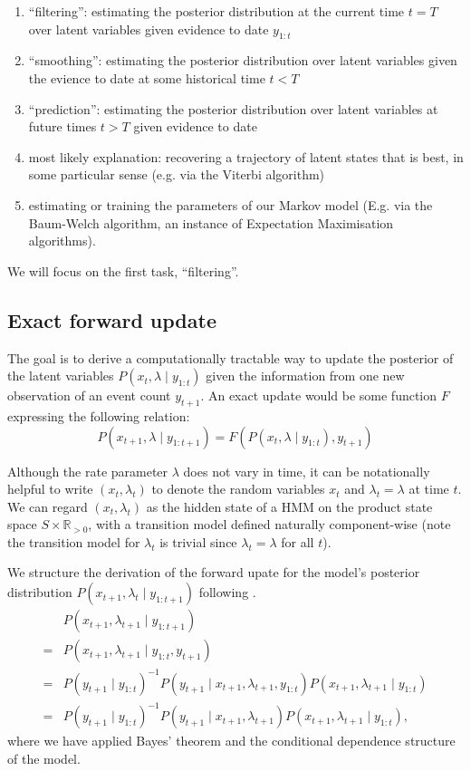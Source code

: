 \documentclass[twoside, 11pt]{article}
\newcommand{\reals}[0] {\mathbb{R}}
\begin{document}
\begin{enumerate}
\item ``filtering'': estimating the posterior distribution at the current time $t=T$ over latent variables given evidence to date $y_{1:t}$
\item ``smoothing'': estimating the posterior distribution over latent variables given the evience to date at some historical time $t<T$
\item ``prediction'': estimating the posterior distribution over latent variables at future times $t>T$ given evidence to date
\item most likely explanation: recovering a trajectory of latent states that is best, in some particular sense (e.g. via the Viterbi algorithm)
\item estimating or training the parameters of our Markov model (E.g. via the Baum-Welch algorithm, an instance of Expectation Maximisation algorithms).
\end{enumerate}

We will focus on the first task, ``filtering''.

\subsection{Exact forward update}

The goal is to derive a computationally tractable way to update the posterior of the latent variables $P(x_t, \lambda \mid y_{1:t})$ given the information from one new observation of an event count $y_{t+1}$. An exact update would be some function $F$ expressing the following relation:
\begin{equation}
P(x_{t+1}, \lambda \mid y_{1:t+1}) = F\left( P(x_t, \lambda \mid y_{1:t}), y_{t+1}\right)
\end{equation}

Although the rate parameter $\lambda$ does not vary in time, it can be notationally helpful to write $(x_t, \lambda_t)$ to denote the random variables $x_t$ and $\lambda_t=\lambda$ at time $t$. We can regard $(x_t, \lambda_t)$ as the hidden state of a HMM on the product state space $S \times \reals_{>0}$, with a transition model defined naturally component-wise (note the transition model for $\lambda_t$ is trivial since $\lambda_t=\lambda$ for all $t$).

We structure the derivation of the forward upate for the model's posterior distribution $P(x_{t+1}, \lambda_t \mid y_{1:{t+1}})$ following \citet*{russell2002artificial}.
\begin{align}
& P(x_{t+1}, \lambda_{t+1} \mid y_{1:{t+1}}) \nonumber \\
= & P(x_{t+1}, \lambda_{t+1} \mid y_{1:t}, y_{t+1}) \nonumber \\
= & P(y_{t+1} \mid y_{1:t})^{-1} P(y_{t+1} \mid x_{t+1}, \lambda_{t+1}, y_{1:t}) P(x_{t+1}, \lambda_{t+1} \mid y_{1:t}) \nonumber \\
= & P(y_{t+1} \mid y_{1:t})^{-1} P(y_{t+1} \mid x_{t+1}, \lambda_{t+1}) P(x_{t+1}, \lambda_{t+1} \mid y_{1:t}) , \label{eqn:rawforward}
\end{align}
where we have applied Bayes' theorem and the conditional dependence structure of the model.
\end{document}
